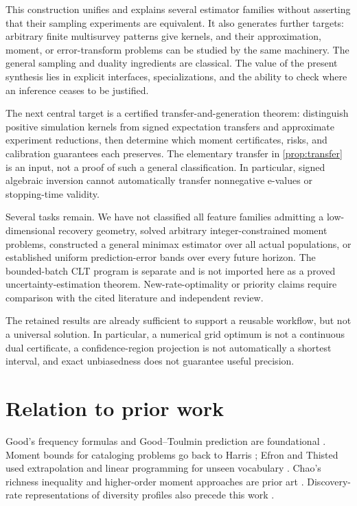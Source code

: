 \documentclass[11pt]{article}
\numberwithin{equation}{section}
\theoremstyle{definition}
\theoremstyle{remark}
\begin{document}
This construction unifies and explains several estimator families without asserting that their sampling experiments are equivalent. It also generates further targets: arbitrary finite multisurvey patterns give kernels, and their approximation, moment, or error-transform problems can be studied by the same machinery. The general sampling and duality ingredients are classical. The value of the present synthesis lies in explicit interfaces, specializations, and the ability to check where an inference ceases to be justified.

The next central target is a certified transfer-and-generation theorem: distinguish positive simulation kernels from signed expectation transfers and approximate experiment reductions, then determine which moment certificates, risks, and calibration guarantees each preserves. The elementary transfer in \cref{prop:transfer} is an input, not a proof of such a general classification. In particular, signed algebraic inversion cannot automatically transfer nonnegative e-values or stopping-time validity.

Several tasks remain. We have not classified all feature families admitting a low-dimensional recovery geometry, solved arbitrary integer-constrained moment problems, constructed a general minimax estimator over all actual populations, or established uniform prediction-error bands over every future horizon. The bounded-batch CLT program is separate and is not imported here as a proved uncertainty-estimation theorem. New-rate-optimality or priority claims require comparison with the cited literature and independent review.

The retained results are already sufficient to support a reusable workflow, but not a universal solution. In particular, a numerical grid optimum is not a continuous dual certificate, a confidence-region projection is not automatically a shortest interval, and exact unbiasedness does not guarantee useful precision.

\section{Relation to prior work}\label{sec:prior}
Good's frequency formulas and Good--Toulmin prediction are foundational \cite{Good1953,GoodToulmin1956}. Moment bounds for cataloging problems go back to Harris \cite{Harris1959}; Efron and Thisted used extrapolation and linear programming for unseen vocabulary \cite{EfronThisted1976}. Chao's richness inequality and higher-order moment approaches are prior art \cite{Chao1984,DaleySmith2016}. Discovery-rate representations of diversity profiles also precede this work \cite{ChaoJost2015}.
\end{document}
